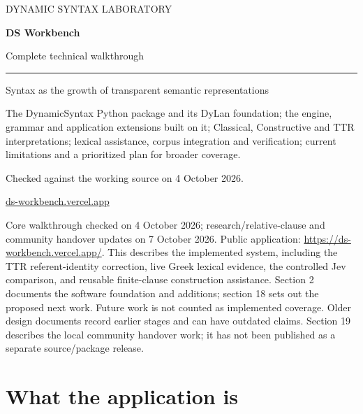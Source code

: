 \documentclass[11pt,a4paper]{article}
\begin{document}
\begin{titlepage}
\thispagestyle{empty}
\vspace*{19mm}
{\small\color{DSmuted}\MakeUppercase{Dynamic Syntax Laboratory}\par}
\vspace{13mm}
{\fontsize{36}{41}\selectfont\bfseries\color{DSgreen}DS Workbench\par}
\vspace{4mm}
{\Large Complete technical walkthrough\par}
\vspace{9mm}
{\color{DSgreen}\rule{\linewidth}{0.7pt}}
\vspace{6mm}
{\large Syntax as the growth of transparent semantic representations\par}
\vspace{12mm}
\begin{minipage}{0.90\linewidth}
The DynamicSyntax Python package and its DyLan foundation; the engine, grammar
and application extensions built on it; Classical, Constructive and TTR
interpretations; lexical assistance, corpus integration and verification;
current limitations and a prioritized plan for broader coverage.
\end{minipage}
\vfill
{\color{DSmuted}Checked against the working source on 4 October 2026.\par}
\vspace{3mm}
\href{https://ds-workbench.vercel.app/}{ds-workbench.vercel.app}
\end{titlepage}
\tableofcontents
\clearpage
{}
Core walkthrough checked on 4 October 2026; research/relative-clause and
community handover updates on 7 October 2026. Public application:
\url{https://ds-workbench.vercel.app/}. This describes the implemented
system, including the TTR referent-identity correction, live Greek
lexical evidence, the controlled Jev comparison, and reusable
finite-clause construction assistance. Section 2 documents the software
foundation and additions; section 18 sets out the proposed next work.
Future work is not counted as implemented coverage. Older design
documents record earlier stages and can have outdated claims. Section 19
describes the local community handover work; it has not been published
as a separate source/package release.

\section{What the application is}\label{what-the-application-is}
\end{document}
